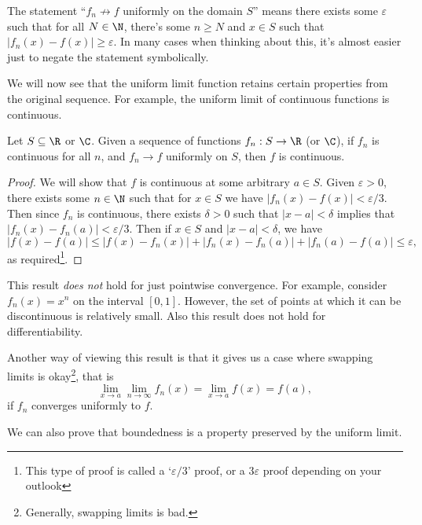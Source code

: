 \begin{remark}
    The statement ``$f_n \not \rightarrow f$ uniformly on the domain $S$'' means there exists some $\varepsilon$ such that for all $N \in \N$, there's some $n \geq N$ and $x \in S$ such that $|f_n(x) - f(x)| \geq \varepsilon$. In many cases when thinking about this, it's almost easier just to negate the statement symbolically.
\end{remark}

We will now see that the uniform limit function retains certain properties from the original sequence. For example, the uniform limit of continuous functions is continuous.

\begin{theorem}
    Let $S \subseteq \R$ or $\C$. Given a sequence of functions $f_n : S \rightarrow \R$ (or $\C$), if $f_n$ is continuous for all $n$, and $f_n \rightarrow f$ uniformly on $S$, then $f$ is continuous.
\end{theorem}
\begin{proof}
    We will show that $f$ is continuous at some arbitrary $a \in S$. Given $\varepsilon > 0$, there exists some $n \in \N$ such that for $x \in S$ we have $|f_n(x) - f(x)| < \varepsilon /3$. Then since $f_n$ is continuous, there exists $\delta > 0$ such that $|x - a| < \delta$ implies that $|f_n(x) - f_n(a)| < \varepsilon / 3$. Then if $x \in S$ and $|x - a| < \delta$, we have
    $$
    |f(x) - f(a)| \leq |f(x) - f_n(x)| + |f_n(x) - f_n(a)| + |f_n(a) - f(a)| \leq \varepsilon,
    $$
    as required\footnote{This type of proof is called a `$\varepsilon/3$' proof, or a $3 \varepsilon$ proof depending on your outlook}.
\end{proof}

\begin{remark}
    This result \emph{does not} hold for just pointwise convergence. For example, consider $f_n(x) = x^n$ on the interval $[0, 1]$. However, the set of points at which it can be discontinuous is relatively small. Also this result does not hold for differentiability.
\end{remark}

Another way of viewing this result is that it gives us a case where swapping limits is okay\footnote{Generally, swapping limits is bad.}, that is 
$$
    \lim_{x \to a} \lim_{n \to \infty} f_n(x) = \lim_{x \to a} f(x) = f(a),
$$
if $f_n$ converges uniformly to $f$.

We can also prove that boundedness is a property preserved by the uniform limit.

